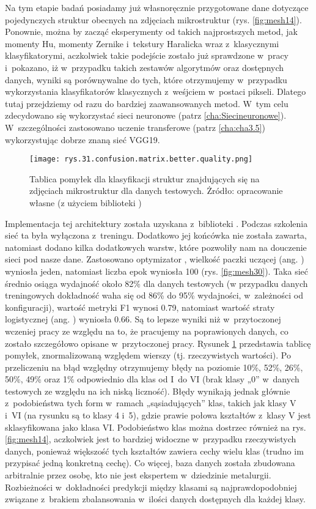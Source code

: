 Na tym etapie badań posiadamy już własnoręcznie przygotowane dane dotyczące pojedynczych struktur obecnych na zdjęciach mikrostruktur (rys. \ref{fig:mesh14}). Ponownie, można by zacząć eksperymenty od takich najprostszych metod, jak momenty Hu, momenty Zernike i~tekstury Haralicka wraz z~klasycznymi klasyfikatorymi, aczkolwiek takie podejście zostało już sprawdzone w~pracy \cite{Reczek21} i~pokazano, iż w~przypadku takich zestawów algorytmów oraz dostępnych danych, wyniki są porównywalne do tych, które otrzymujemy w~przypadku wykorzystania klasyfikatorów klasycznych z~weśjciem w~postaci pikseli. Dlatego tutaj przejdziemy od razu do bardziej zaawansowanych metod. W~tym celu zdecydowano się wykorzystać sieci neuronowe (patrz \ref{cha:Siecineuronowe}). W~szczególności zastosowano uczenie transferowe (patrz \ref{cha:cha3.5}) wykorzystując dobrze znaną sieć VGG19. 
\begin{figure}[h]
    \centering
    \texttt{[image: rys.31.confusion.matrix.better.quality.png]}  %
    \caption{Tablica pomyłek dla klasyfikacji struktur znajdujących się na zdjęciach mikrostruktur dla danych testowych. Żródło: opracowanie własne (z użyciem biblioteki )}
    \label{fig:mesh29}
\end{figure}
Implementacja tej architektury została uzyskana z~biblioteki . Podczas szkolenia sieć ta była wyłączona z~treningu. Dodatkowo jej końcówka nie została zawarta, natomiast dodano kilka dodatkowych warstw, które pozwoliły nam na douczenie sieci pod nasze dane. Zastosowano optymizator , wielkość paczki uczącej (ang. ) wyniosła jeden, natomiast liczba epok wyniosła 100 (rys. \ref{fig:mesh30}).  Taka sieć średnio osiąga wydajność około 82\% dla danych testowych (w przypadku danych treningowych dokładność waha się od 86\% do 95\% wydajności, w~zależności od konfiguracji), wartość metryki F1 wynosi 0.79, natomiast wartość straty logistycznej (ang. ) wyniosła 0.66. Są to lepsze wyniki niż w~przytoczonej wczeniej pracy \cite{Reczek21} ze względu na to, że pracujemy na poprawionych danych, co zostało szczegółowo opisane w~przytoczonej pracy. Rysunek \ref{fig:mesh29} przedstawia tablicę pomyłek, znormalizowaną względem wierszy (tj. rzeczywistych wartości). 
Po przeliczeniu na błąd względny otrzymujemy błędy na poziomie 10\%, 52\%, 26\%, 50\%, 49\% oraz 1\% odpowiednio dla klas od I~do VI (brak klasy „0” w~danych testowych ze względu na ich niską liczność). Błędy wynikają jednak głównie z~podobieństwa tych form w~ramach „sąsiadujących” klas, takich jak klasy V i~VI (na rysunku są to klasy 4 i~5), gdzie prawie połowa kształtów z~klasy V jest sklasyfikowana jako klasa VI. Podobieństwo klas można dostrzec również na rys. \ref{fig:mesh14}, aczkolwiek jest to bardziej widoczne w~przypadku rzeczywistych danych, ponieważ większość tych kształtów zawiera cechy wielu klas (trudno im przypisać jedną konkretną cechę). Co więcej, baza danych została zbudowana arbitralnie przez osobę, kto nie jest ekspertem w~dziedzinie metalurgii. Rozbieżności w~dokładności predykcji między klasami są najprawdopodobniej związane z~brakiem zbalansowania w~ilości danych dostępnych dla każdej klasy.
